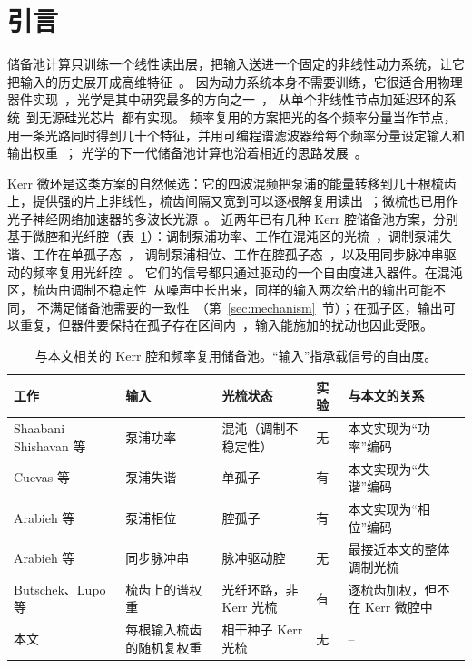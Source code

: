 \section{引言}\label{sec:intro}

储备池计算只训练一个线性读出层，把输入送进一个固定的非线性动力系统，让它把输入的历史展开成高维特征~\cite{jaeger2001,jaeger2004}。
因为动力系统本身不需要训练，它很适合用物理器件实现~\cite{tanaka2019}，光学是其中研究最多的方向之一~\cite{vandersande2017,shastri2021}，
从单个非线性节点加延迟环的系统~\cite{appeltant2011,larger2012,paquot2012,brunner2013}到无源硅光芯片~\cite{vandoorne2014}都有实现。
频率复用的方案把光的各个频率分量当作节点，用一条光路同时得到几十个特征，并用可编程谱滤波器给每个频率分量设定输入和输出权重~\cite{butschek2020,lupo2021,lupo2023}；
光学的下一代储备池计算也沿着相近的思路发展~\cite{cox2024,wang2025ngrc}。

Kerr 微环是这类方案的自然候选：它的四波混频把泵浦的能量转移到几十根梳齿上，提供强的片上非线性，梳齿间隔又宽到可以逐根解复用读出~\cite{kippenberg2018,pasquazi2018}；微梳也已用作光子神经网络加速器的多波长光源~\cite{xu2021,feldmann2021}。
近两年已有几种 Kerr 腔储备池方案，分别基于微腔和光纤腔（表~\ref{tab:related}）：调制泵浦功率、工作在混沌区的光梳~\cite{shishavan2025}，调制泵浦失谐、工作在单孤子态~\cite{cuevas2025}，
调制泵浦相位、工作在腔孤子态~\cite{leo2010,arabieh2026soliton}，以及用同步脉冲串驱动的频率复用光纤腔~\cite{arabieh2026pulse}。
它们的信号都只通过驱动的一个自由度进入器件。在混沌区，梳齿由调制不稳定性~\cite{haelterman1992}从噪声中长出来，同样的输入两次给出的输出可能不同，
不满足储备池需要的一致性~\cite{uchida2004,jaeger2001}（第~\ref{sec:mechanism}~节）；在孤子区，输出可以重复，但器件要保持在孤子存在区间内~\cite{herr2014}，输入能施加的扰动也因此受限。

\begin{table}[htbp]
\centering
\caption{与本文相关的 Kerr 腔和频率复用储备池。“输入”指承载信号的自由度。}
\label{tab:related}
\footnotesize
\begin{tabular}{p{3.0cm}p{2.6cm}p{2.4cm}p{1.2cm}p{3.6cm}}
\toprule
工作 & 输入 & 光梳状态 & 实验 & 与本文的关系 \\
\midrule
Shaabani Shishavan 等~\cite{shishavan2025} & 泵浦功率 & 混沌（调制不稳定性） & 无 & 本文实现为“功率”编码 \\
Cuevas 等~\cite{cuevas2025} & 泵浦失谐 & 单孤子 & 有 & 本文实现为“失谐”编码 \\
Arabieh 等~\cite{arabieh2026soliton} & 泵浦相位 & 腔孤子 & 有 & 本文实现为“相位”编码 \\
Arabieh 等~\cite{arabieh2026pulse} & 同步脉冲串 & 脉冲驱动腔 & 无 & 最接近本文的整体调制光梳 \\
Butschek、Lupo 等~\cite{butschek2020,lupo2021,lupo2023} & 梳齿上的谱权重 & 光纤环路，非 Kerr 光梳 & 有 & 逐梳齿加权，但不在 Kerr 微腔中 \\
本文 & 每根输入梳齿的随机复权重 & 相干种子 Kerr 光梳 & 无 & -- \\
\bottomrule
\end{tabular}
\end{table}

